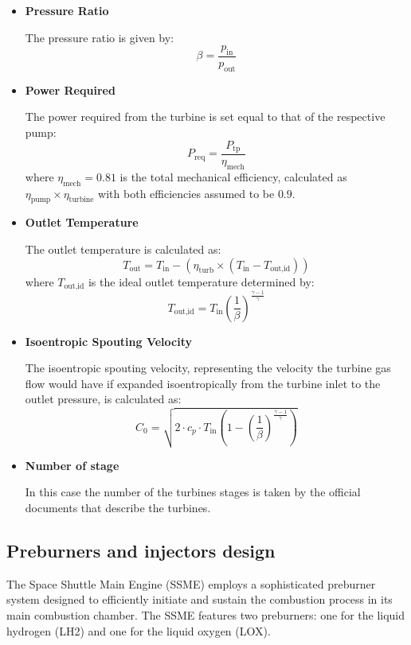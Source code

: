 \begin{itemize}
    \item \textbf{Pressure Ratio}
    
    The pressure ratio is given by:
    \[
    \beta = \frac{p_{\text{in}}}{p_{\text{out}}}
    \]

    \item \textbf{Power Required}
    
    The power required from the turbine is set equal to that of the respective pump:
    \[
    P_{\text{req}} = \frac{P_{\text{tp}}}{\eta_{\text{mech}}}
    \]
    where \( \eta_{\text{mech}} = 0.81 \) is the total mechanical efficiency, calculated as \( \eta_{\text{pump}} \times \eta_{\text{turbine}} \) with both efficiencies assumed to be \(0.9\).

    \item \textbf{Outlet Temperature} 
    
    The outlet temperature is calculated as:
    \[
    T_{\text{out}} = T_{\text{in}} - \left(\eta_{\text{turb}} \times \left(T_{\text{in}} - T_{\text{out,id}}\right)\right)
    \]
    where \(T_{\text{out,id}}\) is the ideal outlet temperature determined by:
    \[
    T_{\text{out,id}} = T_{\text{in}} \left(\frac{1}{\beta}\right)^{\frac{\gamma - 1}{\gamma}}
    \]

    \item \textbf{Isoentropic Spouting Velocity} 
    
    The isoentropic spouting velocity, representing the velocity the turbine gas flow would have if expanded isoentropically from the turbine inlet to the outlet pressure, is calculated as:
    \[
    C_0 = \sqrt{2 \cdot c_p \cdot T_{\text{in}} \left(1 - \left(\frac{1}{\beta}\right)^{\frac{\gamma - 1}{\gamma}}\right)}
    \]

\item\textbf{Number of stage}

In this case the number of the turbines stages is taken by the official documents that describe the turbines.
\end{itemize}
\subsection{Preburners and injectors design}

The Space Shuttle Main Engine (SSME) employs a sophisticated preburner system designed to efficiently initiate and sustain the combustion process in its main combustion chamber. The SSME features two preburners: one for the liquid hydrogen (LH2) and one for the liquid oxygen (LOX).

